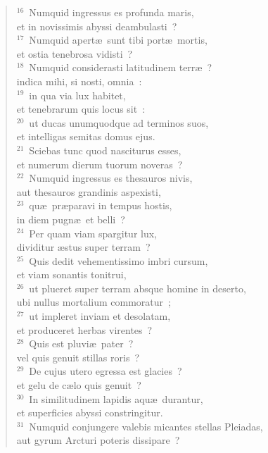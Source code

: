 \begin{flushleft}
\begin{verse}
${}^{16}$~Numquid ingressus es profunda maris,\\ et in novissimis abyssi deambulasti~?\\
${}^{17}$~Numquid apert\ae\ sunt tibi port\ae\ mortis,\\ et ostia tenebrosa vidisti~?\\
${}^{18}$~Numquid considerasti latitudinem terr\ae~?\\ indica mihi, si nosti, omnia~:\\
${}^{19}$~in qua via lux habitet,\\ et tenebrarum quis locus sit~:\\
${}^{20}$~ut ducas unumquodque ad terminos suos,\\ et intelligas semitas domus ejus.\\
${}^{21}$~Sciebas tunc quod nasciturus esses,\\ et numerum dierum tuorum noveras~?\\
${}^{22}$~Numquid ingressus es thesauros nivis,\\ aut thesauros grandinis aspexisti,\\
${}^{23}$~qu\ae\ pr\ae paravi in tempus hostis,\\ in diem pugn\ae\ et belli~?\\
${}^{24}$~Per quam viam spargitur lux,\\ dividitur \ae stus super terram~?\\
${}^{25}$~Quis dedit vehementissimo imbri cursum,\\ et viam sonantis tonitrui,\\
${}^{26}$~ut plueret super terram absque homine in deserto,\\ ubi nullus mortalium commoratur~;\\
${}^{27}$~ut impleret inviam et desolatam,\\ et produceret herbas virentes~?\\
${}^{28}$~Quis est pluvi\ae\ pater~?\\ vel quis genuit stillas roris~?\\
${}^{29}$~De cujus utero egressa est glacies~?\\ et gelu de c\ae lo quis genuit~?\\
${}^{30}$~In similitudinem lapidis aqu\ae\ durantur,\\ et superficies abyssi constringitur.\\
${}^{31}$~Numquid conjungere valebis micantes stellas Pleiadas,\\ aut gyrum Arcturi poteris dissipare~?\\

\end{verse}
\end{flushleft}
